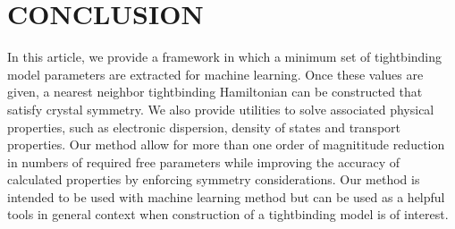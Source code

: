 \documentclass{article}
\begin{document}
\section{CONCLUSION}
In this article, we provide a framework in which a minimum set of tightbinding model
parameters are extracted for machine learning. Once these values are given, a 
nearest neighbor tightbinding Hamiltonian can be constructed that satisfy crystal 
symmetry. We also provide utilities to solve associated physical properties, such as 
electronic dispersion, density of states and transport properties. Our method 
allow for more than one order of magnititude reduction in numbers of required free parameters
while improving the accuracy of calculated properties by enforcing symmetry 
considerations. Our method is intended to be used with machine learning method but 
can be used as a helpful tools in general context when construction of a tightbinding model 
is of interest. 
\end{document}
